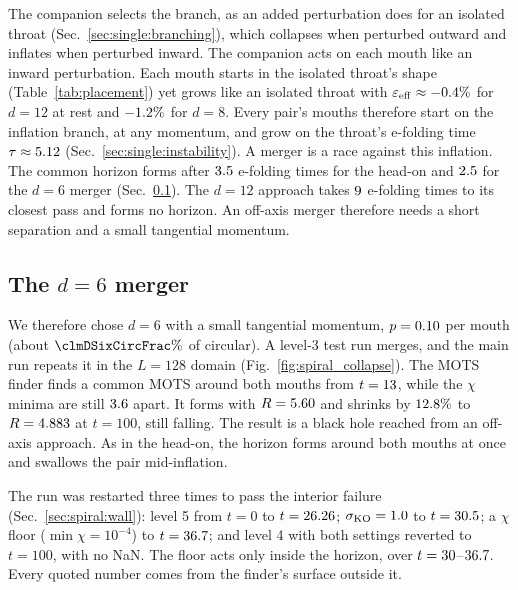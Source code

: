 \documentclass[twocolumn,floatfix,aps,prd,superscriptaddress,nofootinbib]{revtex4-2}
\begin{document}
The companion selects the branch, as an added perturbation does for an isolated throat (Sec.~\ref{sec:single:branching}), which collapses when perturbed outward and inflates when perturbed inward. The companion acts on each mouth like an inward perturbation. Each mouth starts in the isolated throat's shape (Table~\ref{tab:placement}) yet grows like an isolated throat with $\varepsilon_{\rm eff}\approx-0.4\%$ for $d=12$ at rest and $-1.2\%$ for $d=8$. Every pair's mouths therefore start on the inflation branch, at any momentum, and grow on the throat's e-folding time $\tau\approx5.12$ (Sec.~\ref{sec:single:instability}). A merger is a race against this inflation. The common horizon forms after $3.5$ e-folding times for the head-on and $2.5$ for the $d=6$ merger (Sec.~\ref{sec:spiral:inspiral}). The $d=12$ approach takes $9$ e-folding times to its closest pass and forms no horizon. An off-axis merger therefore needs a short separation and a small tangential momentum.

\subsection{The $d=6$ merger}
\label{sec:spiral:inspiral}

We therefore chose $d=6$ with a small tangential momentum, $p=0.10$ per mouth (about $\clmDSixCircFrac\%$ of circular). A level-3 test run merges, and the main run repeats it in the $L=128$ domain (Fig.~\ref{fig:spiral_collapse}). The MOTS finder finds a common MOTS around both mouths from $t=13$, while the $\chi$ minima are still $3.6$ apart. It forms with $R=5.60$ and shrinks by $12.8\%$ to $R=4.883$ at $t=100$, still falling. The result is a black hole reached from an off-axis approach. As in the head-on, the horizon forms around both mouths at once and swallows the pair mid-inflation.

The run was restarted three times to pass the interior failure (Sec.~\ref{sec:spiral:wall}): level 5 from $t=0$ to $t=26.26$; $\sigma_{\rm KO}=1.0$ to $t=30.5$; a $\chi$ floor ($\min\chi=10^{-4}$) to $t=36.7$; and level 4 with both settings reverted to $t=100$, with no NaN. The floor acts only inside the horizon, over $t=30$--$36.7$. Every quoted number comes from the finder's surface outside it.
\end{document}
